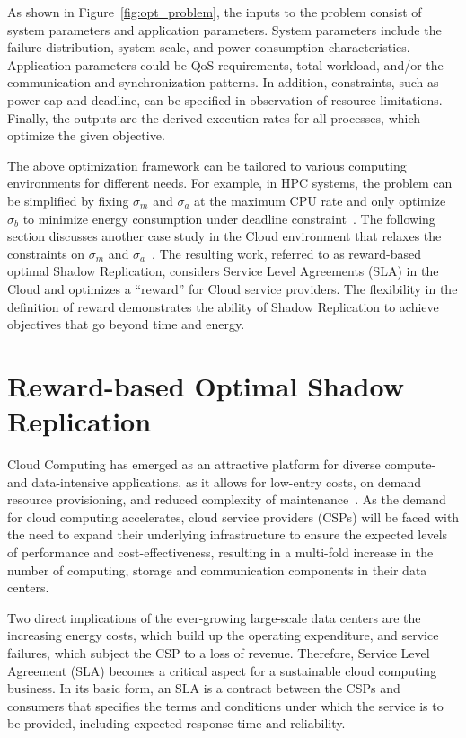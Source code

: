 As shown in Figure~\ref{fig:opt_problem}, the inputs to the problem consist of system parameters and application parameters. System parameters include the failure distribution, system scale, and power consumption characteristics. Application parameters could be QoS requirements, total workload, and/or the communication and synchronization patterns. In addition, constraints, such as power cap and deadline, can be specified in observation of resource limitations. Finally, the outputs are the derived execution rates for all processes, which optimize the given objective.

The above optimization framework can be tailored to various computing environments for different needs. For example, in HPC systems, the problem can be simplified by fixing $\sigma_m$ and $\sigma_a$ at the maximum CPU rate and only optimize $\sigma_b$ to minimize energy consumption under deadline constraint~\cite{mills_2014_icnc}. The following section discusses another case study in the Cloud environment that relaxes the constraints on $\sigma_m$ and $\sigma_a$~\cite{cui_2014_closer}. The resulting work, referred to as reward-based optimal Shadow Replication, considers Service Level Agreements (SLA) in the Cloud and optimizes a ``reward'' for Cloud service providers. The flexibility in the definition of reward demonstrates the ability of Shadow Replication to achieve objectives that go beyond time and energy. 



\section{Reward-based Optimal Shadow Replication}
Cloud Computing has emerged as an attractive platform for 
diverse compute- and data-intensive applications, as it allows for
low-entry costs, on demand resource provisioning, and
reduced complexity of maintenance~\cite{tchana_cits_2012}. 
As the demand for cloud computing
accelerates, cloud service providers (CSPs) will be faced with the
need to expand their underlying infrastructure to ensure the expected
levels of performance and cost-effectiveness, resulting
in a multi-fold increase in the number of computing, storage and communication components in their data centers.

Two direct implications of the ever-growing large-scale data centers are the increasing energy costs, which build up the operating expenditure, and service failures, which subject the CSP to a loss of revenue. Therefore, Service Level Agreement (SLA) becomes a critical aspect for a sustainable cloud computing business. 
In its basic form, an SLA is a contract between the CSPs and consumers that specifies the terms and conditions under which the service is to be provided, including expected response time and reliability.


